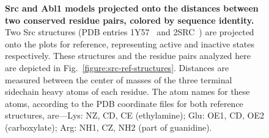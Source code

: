 \documentclass[aps,pre,twocolumn,nofootinbib,superscriptaddress,linenumbers]{revtex4-1}
\begin{document}
\begin{figure}


    \caption{{\bf Src and Abl1 models projected onto the distances between two conserved residue pairs, colored by sequence identity.}
    Two Src structures (PDB entries 1Y57~\cite{cowan-jacob:2005:1y57} and 2SRC~\cite{xu:1999:2src}) are projected onto the plots for reference, representing active and inactive states respectively.
    These structures and the residue pairs analyzed here are depicted in Fig.~\ref{figure:src-ref-structures}.
    Distances are measured between the center of masses of the three terminal sidechain heavy atoms of each residue.
    The atom names for these atoms, according to the PDB coordinate files for both reference structures, are---Lys: NZ, CD, CE (ethylamine); Glu: OE1, CD, OE2 (carboxylate); Arg: NH1, CZ, NH2 (part of guanidine).
    }
  \label{figure:pair-distances}
\end{figure}

\end{document}
